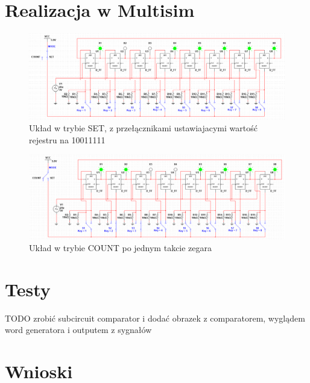 \documentclass[12pt,a4paper,openright]{mwrep}
\begin{document}
\section{Realizacja w Multisim}

\begin{figure}[H]
    \centering
    \includegraphics[width=1\textwidth]{images/2b_set_example.png}
    \caption{Układ w trybie SET, z przełącznikami ustawiajacymi wartość rejestru na 10011111}
    \label{rys:2b_set_example}
\end{figure}

\begin{figure}[H]
    \centering
    \includegraphics[width=1\textwidth]{images/2b_count_tick1_example.png}
    \caption{Układ w trybie COUNT po jednym takcie zegara}
    \label{rys:2b_count_tick1_example}
\end{figure}

\section{Testy}

TODO zrobić subcircuit comparator i dodać obrazek z comparatorem,
wyglądem word generatora i outputem z sygnałów

\section{Wnioski}
\end{document}
